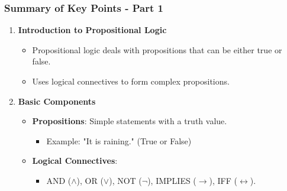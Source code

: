 \documentclass[aspectratio=169]{beamer}
\begin{document}
\begin{frame}[fragile]
  \frametitle{Summary of Key Points - Part 1}
  \begin{enumerate}
      \item \textbf{Introduction to Propositional Logic}
      \begin{itemize}
          \item Propositional logic deals with propositions that can be either true or false.
          \item Uses logical connectives to form complex propositions.
      \end{itemize}
  
      \item \textbf{Basic Components}
      \begin{itemize}
          \item \textbf{Propositions}: Simple statements with a truth value.
          \begin{itemize}
              \item Example: "It is raining." (True or False)
          \end{itemize}
          \item \textbf{Logical Connectives}:
          \begin{itemize}
              \item AND (\(\land\)), OR (\(\lor\)), NOT (\(\lnot\)), IMPLIES (\(\rightarrow\)), IFF (\(\leftrightarrow\)).
          \end{itemize}
      \end{itemize}
  \end{enumerate}
\end{frame}
\end{document}

